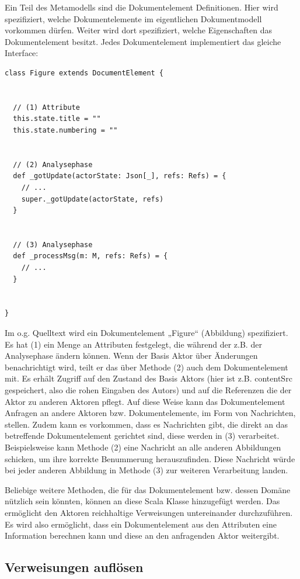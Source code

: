 Ein Teil des Metamodells sind die Dokumentelement Definitionen. Hier wird spezifiziert, welche Dokumentelemente im eigentlichen Dokumentmodell vorkommen dürfen. Weiter wird dort spezifiziert, welche Eigenschaften das Dokumentelement besitzt. Jedes Dokumentelement implementiert das gleiche Interface:

 
\begin{verbatim}
class Figure extends DocumentElement {


  // (1) Attribute
  this.state.title = ""
  this.state.numbering = ""


  // (2) Analysephase
  def _gotUpdate(actorState: Json[_], refs: Refs) = {
    // ...
    super._gotUpdate(actorState, refs)
  }


  // (3) Analysephase
  def _processMsg(m: M, refs: Refs) = {
    // ...
  }


}
\end{verbatim}
 
Im o.g. Quelltext wird ein Dokumentelement „Figure“ (Abbildung) spezifiziert. Es hat (1) ein Menge an Attributen festgelegt, die während der z.B. der Analysephase ändern können. Wenn der Basis Aktor über Änderungen benachrichtigt wird, teilt er das über Methode (2) auch dem Dokumentelement mit. Es erhält Zugriff auf den Zustand des Basis Aktors (hier ist z.B. contentSrc gespeichert, also die rohen Eingaben des Autors) und auf die Referenzen die der Aktor zu anderen Aktoren pflegt. Auf diese Weise kann das Dokumentelement Anfragen an andere Aktoren bzw. Dokumentelemente, im Form von Nachrichten, stellen. Zudem kann es vorkommen, dass es Nachrichten gibt, die direkt an das betreffende Dokumentelement gerichtet sind, diese werden in (3) verarbeitet. Beispielsweise kann Methode (2) eine Nachricht an alle anderen Abbildungen schicken, um ihre korrekte Benummerung herauszufinden. Diese Nachricht würde bei jeder anderen Abbildung in Methode (3) zur weiteren Verarbeitung landen.

 
Beliebige weitere Methoden, die für das Dokumentelement bzw. dessen Domäne nützlich sein könnten, können an diese Scala Klasse hinzugefügt werden. Das ermöglicht den Aktoren reichhaltige Verweisungen untereinander durchzuführen. Es wird also ermöglicht, dass ein Dokumentelement aus den Attributen eine Information berechnen kann und diese an den anfragenden Aktor weitergibt.

 
\subsection{Verweisungen auflösen}\label{verweise-aufloesen}
 
